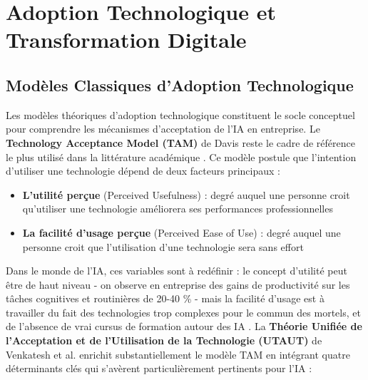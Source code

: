 \section{Adoption Technologique et Transformation Digitale}

\subsection{Modèles Classiques d'Adoption Technologique}

Les modèles théoriques d'adoption technologique constituent le socle conceptuel pour comprendre les mécanismes d'acceptation de l'IA en entreprise. Le \textbf{Technology Acceptance Model (TAM)} de Davis \cite{davis1989perceived} reste le cadre de référence le plus utilisé dans la littérature académique \cite{artimon2025theorie}. Ce modèle postule que l'intention d'utiliser une technologie dépend de deux facteurs principaux :
\medskip
\begin{itemize}
    \item \textbf{L'utilité perçue} (Perceived Usefulness) : degré auquel une personne croit qu'utiliser une technologie améliorera ses performances professionnelles
    \item \textbf{La facilité d'usage perçue} (Perceived Ease of Use) : degré auquel une personne croit que l'utilisation d'une technologie sera sans effort
\end{itemize}
\medskip
Dans le monde de l’IA, ces variables sont à redéfinir : le concept d’utilité peut être de haut niveau - on observe en entreprise des gains de productivité sur les tâches cognitives et routinières de 20-40 \% - mais la facilité d’usage est à travailler du fait des technologies trop complexes pour le commun des mortels, et de l’absence de vrai cursus de formation autour des IA \cite{psicosmart2024resistance}.
\newpage
La \textbf{Théorie Unifiée de l'Acceptation et de l'Utilisation de la Technologie (UTAUT)} de Venkatesh et al. \cite{venkatesh2003user} enrichit substantiellement le modèle TAM en intégrant quatre déterminants clés qui s'avèrent particulièrement pertinents pour l'IA :

